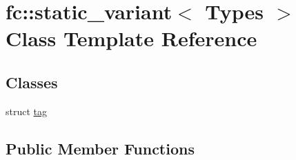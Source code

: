 \hypertarget{classfc_1_1static__variant}{}\section{fc\+:\+:static\+\_\+variant$<$ Types $>$ Class Template Reference}
\label{classfc_1_1static__variant}
\subsection*{Classes}
\begin{DoxyCompactItemize}
\item 
struct \mbox{\hyperlink{structfc_1_1static__variant_1_1tag}{tag}}
\end{DoxyCompactItemize}
\subsection*{Public Member Functions}
